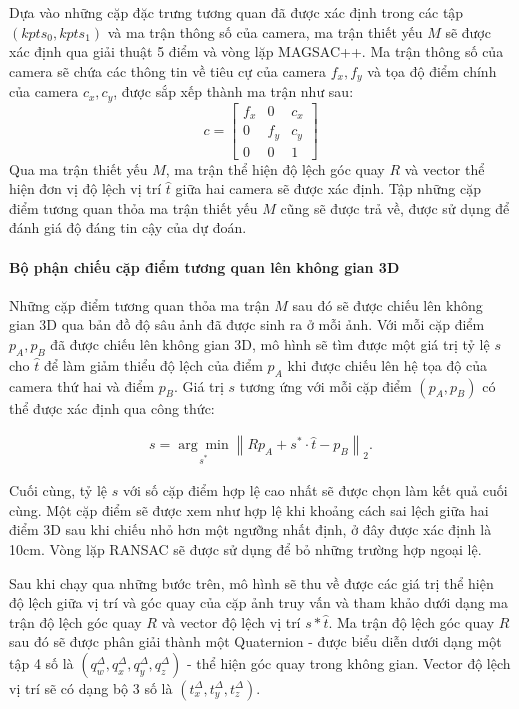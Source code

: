 Dựa vào những cặp đặc trưng tương quan đã được xác định trong các tập $(kpts_0, kpts_1)$ và ma trận thông số của camera, ma trận thiết yếu $M$ sẽ được xác định qua giải thuật 5 điểm và vòng lặp MAGSAC++. Ma trận thông số của camera sẽ chứa các thông tin về tiêu cự của camera $f_x,f_y$ và tọa độ điểm chính của camera $c_x,c_y$, được sắp xếp thành ma trận như sau:
$$
c = \begin{bmatrix} f_x & 0 & c_x \\ 0 & f_y & c_y \\ 0 & 0 & 1 \end{bmatrix}
$$ 
Qua ma trận thiết yếu $M$, ma trận thể hiện độ lệch góc quay $R$ và vector thể hiện đơn vị độ lệch vị trí $\hat{t}$ giữa hai camera sẽ được xác định. Tập những cặp điểm tương quan thỏa ma trận thiết yếu $M$ cũng sẽ được trả về, được sử dụng để đánh giá độ đáng tin cậy của dự đoán.

\paragraph*{Bộ phận chiếu cặp điểm tương quan lên không gian 3D}

Những cặp điểm tương quan thỏa ma trận $M$ sau đó sẽ được chiếu lên không gian 3D qua bản đồ độ sâu ảnh đã được sinh ra ở mỗi ảnh. Với mỗi cặp điểm $p_A, p_B$ đã được chiếu lên không gian 3D, mô hình sẽ tìm được một giá trị tỷ lệ $s$ cho $\hat{t}$ để làm giảm thiểu độ lệch của điểm $p_A$ khi được chiếu lên hệ tọa độ của camera thứ hai và điểm $p_B$. Giá trị $s$ tương ứng với mỗi cặp điểm $(p_A, p_B)$ có thể được xác định qua công thức:

$$
\begin{aligned}
    s=\underset{s^*}{\arg \min }\left\|R p_A+s^* \cdot \hat{t}-p_B\right\|_2 .
\end{aligned}
$$

Cuối cùng, tỷ lệ $s$ với số cặp điểm hợp lệ cao nhất sẽ được chọn làm kết quả cuối cùng. Một cặp điểm sẽ được xem như hợp lệ khi khoảng cách sai lệch giữa hai điểm 3D sau khi chiếu nhỏ hơn một ngưỡng nhất định, ở đây được xác định là 10cm. Vòng lặp RANSAC sẽ được sử dụng để bỏ những trường hợp ngoại lệ.

Sau khi chạy qua những bước trên, mô hình sẽ thu về được các giá trị thể hiện độ lệch giữa vị trí và góc quay của cặp ảnh truy vấn và tham khảo dưới dạng ma trận độ lệch góc quay $R$ và vector độ lệch vị trí $s*\hat{t}$. Ma trận độ lệch góc quay $R$ sau đó sẽ được phân giải thành một Quaternion - được biểu diễn dưới dạng một tập 4 số là $(q^{\Delta}_w,q^{\Delta}_x,q^{\Delta}_y,q^{\Delta}_z)$ - thể hiện góc quay trong không gian. Vector độ lệch vị trí sẽ có dạng bộ 3 số là $(t^{\Delta}_x,t^{\Delta}_y,t^{\Delta}_z)$. 

